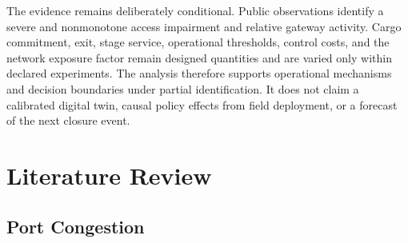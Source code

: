 \documentclass[a4paper,fleqn]{cas-sc}
\begin{document}
The evidence remains deliberately conditional. Public observations identify a
severe and nonmonotone access impairment and relative gateway activity. Cargo
commitment, exit, stage service, operational thresholds, control costs, and the
network exposure factor remain designed quantities and are varied only within
declared experiments. The analysis therefore supports operational mechanisms
and decision boundaries under partial identification. It does not claim a
calibrated digital twin, causal policy effects from field deployment, or a
forecast of the next closure event.


\section{Literature Review}



\subsection{Port Congestion}
\end{document}
